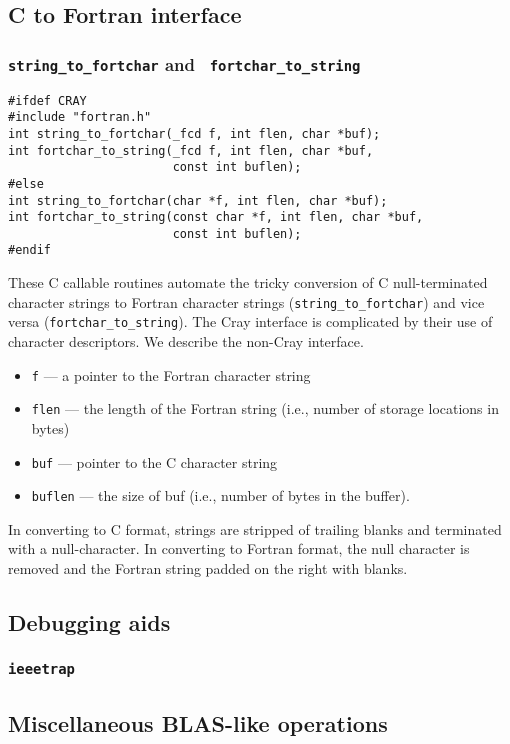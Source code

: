 \subsection{C to Fortran interface}

\subsubsection{{\tt string\_to\_fortchar} and {\tt
    fortchar\_to\_string}}
\begin{verbatim}
#ifdef CRAY
#include "fortran.h"
int string_to_fortchar(_fcd f, int flen, char *buf);
int fortchar_to_string(_fcd f, int flen, char *buf, 
                       const int buflen);
#else
int string_to_fortchar(char *f, int flen, char *buf);
int fortchar_to_string(const char *f, int flen, char *buf, 
                       const int buflen);
#endif
\end{verbatim}
These C callable routines automate the tricky conversion of C
null-terminated character strings to Fortran character strings
(\verb+string_to_fortchar+) and vice versa
(\verb+fortchar_to_string+).  The Cray interface is 
complicated by their use of character descriptors. We describe the
non-Cray interface.
\begin{itemize}
\item {\tt f} --- a pointer to the Fortran character string
\item {\tt flen} --- the length of the Fortran string (i.e., number of
  storage locations in bytes)
\item {\tt buf} --- pointer to the C character string
\item {\tt buflen} --- the size of buf (i.e., number of bytes in the
  buffer).
\end{itemize}
In converting to C format, strings are stripped of trailing blanks and
terminated with a null-character. In converting to Fortran format, the
null character is removed and the Fortran string padded on the right
with blanks.


\subsection{Debugging aids}

\subsubsection{{\tt ieeetrap}}

\subsection{Miscellaneous BLAS-like operations}

